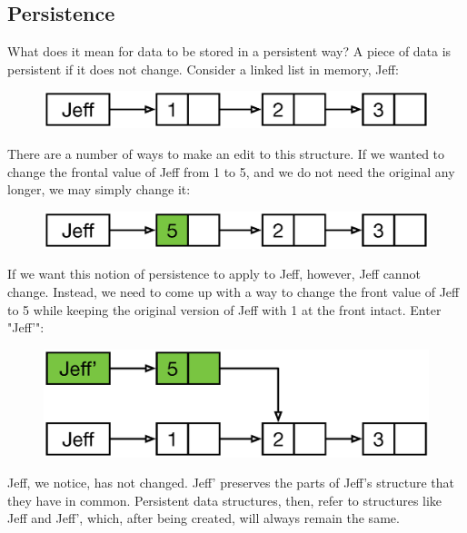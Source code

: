 \documentclass[preprint]{sigplanconf}
\begin{document}
\subsection{Persistence}
What does it mean for data to be stored in a persistent way?
A piece of data is persistent if it does not change.
Consider a linked list in memory, Jeff:
\begin{figure}[H]
\includegraphics[scale=.35]{linkedlist}
\centering
\end{figure}
There are a number of ways to make an edit to this structure.
If we wanted to change the frontal value of Jeff from 1 to 5, and we do not need the original any longer, we may simply change it:
\begin{figure}[H]
\includegraphics[scale=.35]{linkedlist2}
\centering
\end{figure}
If we want this notion of persistence to apply to Jeff, however, Jeff cannot change.
Instead, we need to come up with a way to change the front value of Jeff to 5 while keeping the original version of Jeff with 1 at the front intact.
Enter "Jeff'":
\begin{figure}[H]
\includegraphics[scale=.35]{linkedlist3}
\centering
\end{figure}
Jeff, we notice, has not changed.
Jeff' preserves the parts of Jeff's structure that they have in common.
Persistent data structures, then, refer to structures like Jeff and Jeff', which, after being created, will always remain the same.
\end{document}
